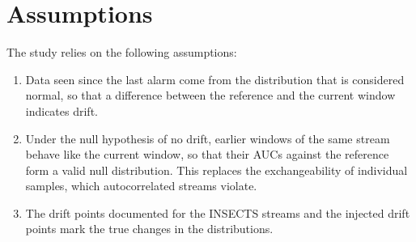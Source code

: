 \section{Assumptions}
The study relies on the following assumptions:
\begin{enumerate}
    \item Data seen since the last alarm come from the distribution that is considered normal, so that a difference between the reference and the current window indicates drift.
    \item Under the null hypothesis of no drift, earlier windows of the same stream behave like the current window, so that their AUCs against the reference form a valid null distribution. This replaces the exchangeability of individual samples, which autocorrelated streams violate.
    \item The drift points documented for the INSECTS streams \citep{Souza2020} and the injected drift points mark the true changes in the distributions.
\end{enumerate}

